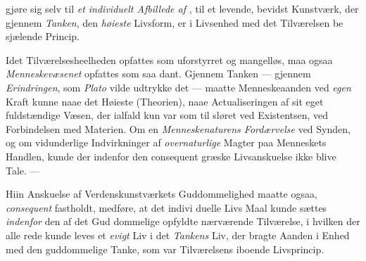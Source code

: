 %
gjøre sig selv til \emph{et individuelt Afbillede af} \emph{},
til et levende, bevidst Kunstværk, der gjennem \emph{Tanken}, den
\emph{høieste} Livsform, er i Livsenhed med det Tilværelsen be\-%
sjælende Princip.

Idet Tilværelsesheelheden opfattes som uforstyrret og
mangelløs, maa ogsaa \emph{Menneskevæsenet} opfattes som saa\-%
dant. Gjennem Tanken --- gjennem \emph{Erindringen}, som
\emph{Plato} vilde udtrykke det --- maatte Menneskeaanden ved \emph{egen}
Kraft kunne naae det Høieste (Theorien), naae Actualiseringen
af sit eget fuldstændige Væsen, der ialfald kun var som til\-%
sløret ved Existentsen, ved Forbindelsen med Materien. Om
en \emph{Menneskenaturens Fordærvelse} ved Synden, og om
vidunderlige Indvirkninger af \emph{overnaturlige} Magter paa
Menneskets Handlen, kunde der indenfor den consequent græske
Livsanskuelse ikke blive Tale. ---

Hiin Anskuelse af Verdenskunstværkets Guddommelighed
maatte ogsaa, \emph{consequent} fastholdt, medføre, at det indivi\-%
duelle Livs Maal kunde sættes \emph{indenfor} den af det Gud\-%
dommelige opfyldte nærværende Tilværelse, i hvilken der alle\-%
rede kunde leves et \emph{evigt} Liv i det \emph{Tankens} Liv, der bragte
Aanden i Enhed med den guddommelige Tanke, som var
Tilværelsens iboende Livsprincip.

